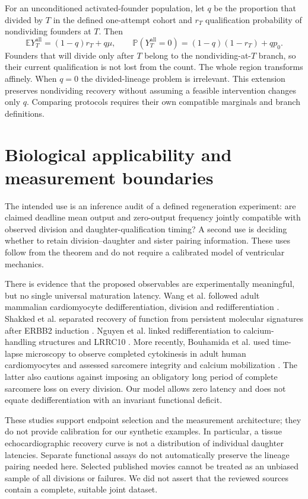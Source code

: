 \documentclass[11pt]{article}
\newcommand{\E}{\mathbb E}\newcommand{\Prb}{\mathbb P}\newcommand{\pos}[1]{\left[#1\right]_+}
\begin{document}
For an unconditioned activated-founder population, let $q$ be the proportion that divided by $T$ in the defined one-attempt cohort and $r_T$ qualification probability of nondividing founders at $T$. Then
\begin{equation}
 \E Y_T^{\mathrm{all}}=(1-q)r_T+q\mu,\qquad
 \Prb(Y_T^{\mathrm{all}}=0)=(1-q)(1-r_T)+qp_0.\label{eq:affine}
\end{equation}
Founders that will divide only after $T$ belong to the nondividing-at-$T$ branch, so their current qualification is not lost from the count. The whole region transforms affinely. When $q=0$ the divided-lineage problem is irrelevant. This extension preserves nondividing recovery without assuming a feasible intervention changes only $q$. Comparing protocols requires their own compatible marginals and branch definitions.

\section{Biological applicability and measurement boundaries}
The intended use is an inference audit of a defined regeneration experiment: are claimed deadline mean output and zero-output frequency jointly compatible with observed division and daughter-qualification timing? A second use is deciding whether to retain division--daughter and sister pairing information. These uses follow from the theorem and do not require a calibrated model of ventricular mechanics.

There is evidence that the proposed observables are experimentally meaningful, but no single universal maturation latency. Wang et al. followed adult mammalian cardiomyocyte dedifferentiation, division and redifferentiation \cite{wang}. Shakked et al. separated recovery of function from persistent molecular signatures after ERBB2 induction \cite{shakked}. Nguyen et al. linked redifferentiation to calcium-handling structures and LRRC10 \cite{nguyen}. More recently, Bouhamida et al. used time-lapse microscopy to observe completed cytokinesis in adult human cardiomyocytes and assessed sarcomere integrity and calcium mobilization \cite{human}. The latter also cautions against imposing an obligatory long period of complete sarcomere loss on every division. Our model allows zero latency and does not equate dedifferentiation with an invariant functional deficit.

These studies support endpoint selection and the measurement architecture; they do not provide calibration for our synthetic examples. In particular, a tissue echocardiographic recovery curve is not a distribution of individual daughter latencies. Separate functional assays do not automatically preserve the lineage pairing needed here. Selected published movies cannot be treated as an unbiased sample of all divisions or failures. We did not assert that the reviewed sources contain a complete, suitable joint dataset.
\end{document}
